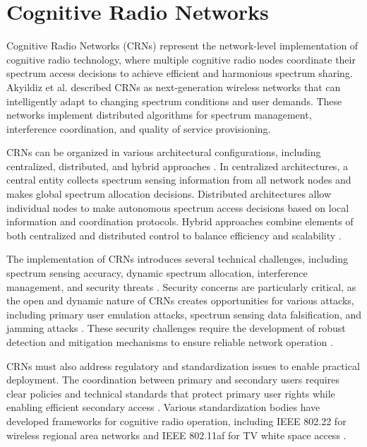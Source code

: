 \section{\textbf{Cognitive Radio Networks}}

Cognitive Radio Networks (CRNs) represent the network-level implementation of cognitive radio technology, where multiple cognitive radio nodes coordinate their spectrum access decisions to achieve efficient and harmonious spectrum sharing. Akyildiz et al. \cite{ref3} described CRNs as next-generation wireless networks that can intelligently adapt to changing spectrum conditions and user demands. These networks implement distributed algorithms for spectrum management, interference coordination, and quality of service provisioning.

CRNs can be organized in various architectural configurations, including centralized, distributed, and hybrid approaches \cite{ref2}. In centralized architectures, a central entity collects spectrum sensing information from all network nodes and makes global spectrum allocation decisions. Distributed architectures allow individual nodes to make autonomous spectrum access decisions based on local information and coordination protocols. Hybrid approaches combine elements of both centralized and distributed control to balance efficiency and scalability \cite{ref3}.

The implementation of CRNs introduces several technical challenges, including spectrum sensing accuracy, dynamic spectrum allocation, interference management, and security threats \cite{ref25}. Security concerns are particularly critical, as the open and dynamic nature of CRNs creates opportunities for various attacks, including primary user emulation attacks, spectrum sensing data falsification, and jamming attacks  \cite{ref7,ref16}. These security challenges require the development of robust detection and mitigation mechanisms to ensure reliable network operation  \cite{ref24}.

CRNs must also address regulatory and standardization issues to enable practical deployment. The coordination between primary and secondary users requires clear policies and technical standards that protect primary user rights while enabling efficient secondary access \cite{ref3}. Various standardization bodies have developed frameworks for cognitive radio operation, including IEEE 802.22 for wireless regional area networks and IEEE 802.11af for TV white space access  \cite{ref25}.



